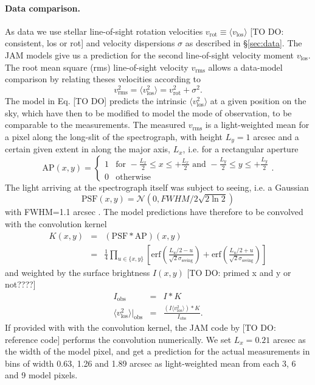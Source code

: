 \paragraph{Data comparison.} As data we use stellar line-of-sight rotation velocities $v_\text{rot} \equiv \langle v_\text{los} \rangle$ [TO DO: consistent, los or rot] and velocity dispersions $\sigma$ as described in \S\ref{sec:data}. The JAM models give us a prediction for the second line-of-sight velocity moment $v_\text{los}$. The root mean square (rms) line-of-sight velocity $v_\text{rms}$ allows a data-model comparison by relating theses velocities according to 
\begin{equation*}
v_\text{rms}^2 = \langle v_\text{los}^2 \rangle = v_\text{rot}^2 + \sigma^2.
\end{equation*}
The model in Eq. [TO DO] predicts the intrinsic $\langle v_\text{los}^2 \rangle$ at a given position on the sky, which have then to be modified to model the mode of observation, to be comparable to the measurements. The measured $v_\text{rms}$ is a light-weighted mean for a pixel along the long-slit of the spectrograph, with height $L_y = 1$ arcsec \citep{SWELLSV} and a certain given extent in along the major axis, $L_x$, i.e. for a rectangular aperture
\begin{equation*}
\text{AP}(x,y) = \left\{ \begin{array}{ll} 1 & \text{for } -\frac{L_x}{2} \leq x \leq + \frac{L_x}{2} \text{ and } - \frac{L_y}{2} \leq y \leq + \frac{L_y}{2}  \\ 0 & \text{otherwise} \end{array} \right. .
\end{equation*}
The light arriving at the spectrograph itself was subject to seeing, i.e. a Gaussian 
\begin{equation*}
\text{PSF}(x,y)=\mathscr{N}(0,FWHM/2\sqrt{2\ln2})
\end{equation*}
with FWHM=1.1 arcsec  \citep{SWELLSV}. The model predictions have therefore to be convolved with the convolution kernel
\begin{eqnarray*}
K(x,y) &=& (\text{PSF} \ast \text{AP})(x,y) \\
&=& \frac{1}{4} \prod_{u \in \{x,y\}} \left[ \text{erf}\left( \frac{L_u/2 - u}{\sqrt{2}\sigma_\text{seeing}}\right) + \text{erf} \left( \frac{L_u/2 + u}{\sqrt{2} \sigma_\text{seeing}} \right) \right]
\end{eqnarray*}
and weighted by the surface brightness $I(x,y)$ [TO DO: primed x and y or not????]
\begin{eqnarray*}
I_\text{obs} &=& I \ast K\\
\langle v_\text{los}^2 \rangle |_\text{obs} &=& \frac{(I \langle v_\text{los}^2\rangle) \ast K}{I_\text{obs}}.
\end{eqnarray*}
If provided with with the convolution kernel, the JAM code by \citet{Cap08} [TO DO: reference code] performs the convolution numerically. We set $L_x = 0.21$ arcsec as the width of the model pixel, and get a prediction for the actual measurements in bins of width 0.63, 1.26 and 1.89 arcsec \citep{SWELLSV} as light-weighted mean from each 3, 6 and 9 model pixels.

